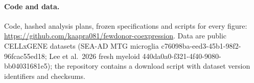 \documentclass[10pt,letterpaper]{article}
\theoremstyle{definition}
\begin{document}
\paragraph{Code and data.} Code, hashed analysis plans, frozen specifications and scripts for every figure: \url{https://github.com/kaapra081/fewdonor-coexpression}. Data are public CELLxGENE datasets (SEA-AD MTG microglia c76098ba-eed3-45b1-98f2-96fcac55ed18; Lee et al.\ 2026 fresh myeloid 440da0a0-f321-4f40-9080-bb04031681e5); the repository contains a download script with dataset version identifiers and checksums.




\clearpage
\appendix

\end{document}
